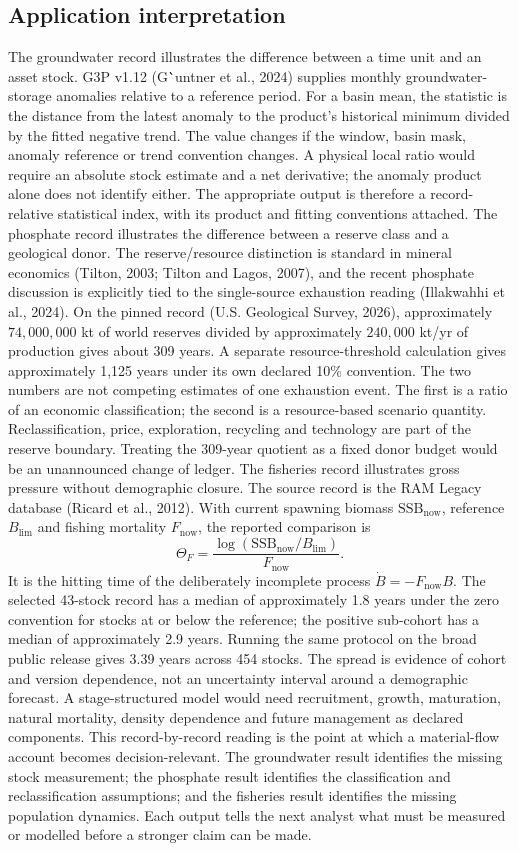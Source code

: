 \documentclass[11pt]{article}
\begin{document}
\subsection{Application interpretation}
The groundwater record illustrates the difference between a time unit and an asset stock. G3P v1.12 (G\``untner et al., 2024) supplies monthly groundwater-storage anomalies relative to a reference period. For a basin mean, the statistic is the distance from the latest anomaly to the product's historical minimum divided by the fitted negative trend. The value changes if the window, basin mask, anomaly reference or trend convention changes. A physical local ratio would require an absolute stock estimate and a net derivative; the anomaly product alone does not identify either. The appropriate output is therefore a record-relative statistical index, with its product and fitting conventions attached.
The phosphate record illustrates the difference between a reserve class and a geological donor. The reserve/resource distinction is standard in mineral economics (Tilton, 2003; Tilton and Lagos, 2007), and the recent phosphate discussion is explicitly tied to the single-source exhaustion reading (Illakwahhi et al., 2024). On the pinned record (U.S. Geological Survey, 2026), approximately \(74{,}000{,}000\) kt of world reserves divided by approximately \(240{,}000\) kt/yr of production gives about 309 years. A separate resource-threshold calculation gives approximately 1,125 years under its own declared 10\% convention. The two numbers are not competing estimates of one exhaustion event. The first is a ratio of an economic classification; the second is a resource-based scenario quantity. Reclassification, price, exploration, recycling and technology are part of the reserve boundary. Treating the 309-year quotient as a fixed donor budget would be an unannounced change of ledger.
The fisheries record illustrates gross pressure without demographic closure. The source record is the RAM Legacy database (Ricard et al., 2012). With current spawning biomass \(\mathrm{SSB}_{\mathrm{now}}\), reference \(B_{\lim}\) and fishing mortality \(F_{\mathrm{now}}\), the reported comparison is
\[\Theta_F=\frac{\log(\mathrm{SSB}_{\mathrm{now}}/B_{\lim})}{F_{\mathrm{now}}}.\]
It is the hitting time of the deliberately incomplete process \(\dot B=-F_{\mathrm{now}}B\). The selected 43-stock record has a median of approximately 1.8 years under the zero convention for stocks at or below the reference; the positive sub-cohort has a median of approximately 2.9 years. Running the same protocol on the broad public release gives 3.39 years across 454 stocks. The spread is evidence of cohort and version dependence, not an uncertainty interval around a demographic forecast. A stage-structured model would need recruitment, growth, maturation, natural mortality, density dependence and future management as declared components.
This record-by-record reading is the point at which a material-flow account becomes decision-relevant. The groundwater result identifies the missing stock measurement; the phosphate result identifies the classification and reclassification assumptions; and the fisheries result identifies the missing population dynamics. Each output tells the next analyst what must be measured or modelled before a stronger claim can be made.
\end{document}
